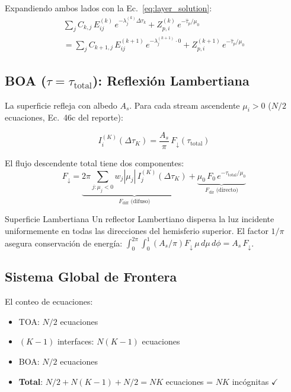 \documentclass[a4paper,11pt]{article}
\begin{document}
Expandiendo ambos lados con la Ec.~\eqref{eq:layer_solution}:
\begin{multline}\label{eq:bc_interface_expanded}
    \sum_j C_{k,j}\,E^{(k)}_{ij}\,e^{-\lambda^{(k)}_j\Delta\tau_k}
    + Z_{p,i}^{(k)}\,e^{-\hat{\tau}_p/\mu_0} \\
    = \sum_j C_{k+1,j}\,E^{(k+1)}_{ij}\,e^{-\lambda^{(k+1)}_j\cdot 0}
    + Z_{p,i}^{(k+1)}\,e^{-\hat{\tau}_p/\mu_0}
\end{multline}

\subsection{BOA ($\tau=\tau_{\text{total}}$): Reflexi\'on Lambertiana}

La superficie refleja con albedo $A_s$.  Para cada stream ascendente
$\mu_i > 0$ ($N/2$ ecuaciones, Ec.~46c del reporte):

\begin{equation}\label{eq:bc_boa}
    I_i^{(K)}(\Delta\tau_K) = \frac{A_s}{\pi}\,F_{\downarrow}(\tau_{\text{total}})
\end{equation}

El flujo descendente total tiene dos componentes:
\begin{equation}\label{eq:flux_down}
    F_{\downarrow} = \underbrace{2\pi\sum_{j:\mu_j<0}w_j|\mu_j|\,I_j^{(K)}(\Delta\tau_K)}_{F_{\text{diff}}\text{ (difuso)}}
    + \underbrace{\mu_0\,F_0\,e^{-\tau_{\text{total}}/\mu_0}}_{F_{\text{dir}}\text{ (directo)}}
\end{equation}

\begin{physics}{Superficie Lambertiana}
Un reflector Lambertiano dispersa la luz incidente uniformemente en todas las
direcciones del hemisferio superior.  El factor $1/\pi$ asegura conservaci\'on
de energ\'ia: $\int_0^{2\pi}\int_0^1 (A_s/\pi)F_{\downarrow}\,\mu\,d\mu\,d\phi
= A_s\,F_{\downarrow}$.
\end{physics}

\subsection{Sistema Global de Frontera}

El conteo de ecuaciones:
\begin{itemize}
    \item TOA: $N/2$ ecuaciones
    \item $(K-1)$ interfaces: $N(K-1)$ ecuaciones
    \item BOA: $N/2$ ecuaciones
    \item \textbf{Total}: $N/2 + N(K-1) + N/2 = NK$ ecuaciones = $NK$ inc\'ognitas $\checkmark$
\end{itemize}
\end{document}

